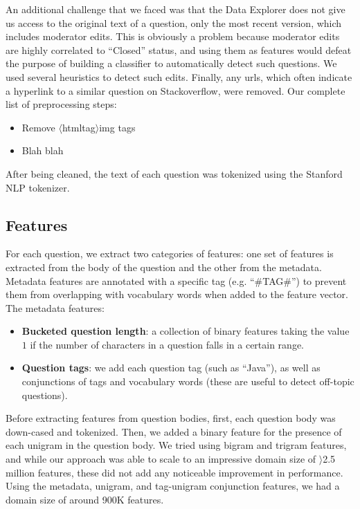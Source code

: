 \documentclass[11pt]{article}
\newcommand{\htmltag}{$\langle${htmltag}$\rangle$}
\begin{document}
An additional challenge that we faced was that the Data Explorer does not give us access to the original text of a question, only the most recent version, which includes moderator edits. This is obviously a problem because moderator edits are highly correlated to ``Closed'' status, and using them as features would defeat the purpose of building a classifier to automatically detect such questions. We used several heuristics to detect such edits. Finally, any urls, which often indicate a hyperlink to a similar
question on Stackoverflow, were removed. Our complete list of preprocessing steps:

\begin{itemize}
\item Remove \htmltag{img} tags
\item Blah blah
\end{itemize}

After being cleaned, the text of each question was tokenized using the Stanford NLP tokenizer.

\subsection{Features}

For each question, we extract two categories of features: one set of features is extracted from the body of the question and the other from the metadata. Metadata features are annotated with a specific tag (e.g. ``#TAG#'') to prevent them from overlapping with vocabulary words when added to the feature vector. The metadata features:

\begin{itemize}
  \item \textbf{Bucketed question length}: a collection of binary features
    taking the value $1$ if the number of characters in a question falls in a certain range.
  \item \textbf{Question tags}: we add each question tag (such as ``Java''), as well as conjunctions of tags and vocabulary words (these are useful to detect off-topic questions).
\end{itemize}

Before extracting features from question bodies, first, each question
body was down-cased and tokenized. Then, we added a binary feature for the presence of each unigram in the question body. We tried using bigram and trigram features, and while our approach was able to scale to an impressive domain size of $\rangle$2.5 million features, these did not add any noticeable improvement in performance. Using the metadata, unigram, and tag-unigram conjunction features, we had a domain size of around 900K features. 
\end{document}
